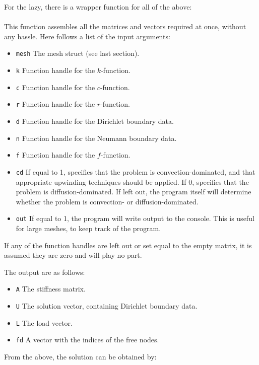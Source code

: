 \documentclass[a4paper,10pt]{article}
\begin{document}
For the lazy, there is a wrapper function for all of the above: \\

 \\

This function assembles all the matrices and vectors required at once, without
any hassle. Here follows a list of the input arguments:

\begin{itemize}
\item {\tt mesh} The mesh struct (see last section).
\item {\tt k} Function handle for the $k$-function.
\item {\tt c} Function handle for the $c$-function.
\item {\tt r} Function handle for the $r$-function.
\item {\tt d} Function handle for the Dirichlet boundary data.
\item {\tt n} Function handle for the Neumann boundary data.
\item {\tt f} Function handle for the $f$-function.
\item {\tt cd} If equal to 1, specifies that the problem is convection-dominated,
and that appropriate upwinding techniques should be applied. If 0, specifies
that the problem is diffusion-dominated. If left out, the program itself will
determine whether the problem is convection- or diffusion-dominated.
\item {\tt out} If equal to 1, the program will write output to the console.
This is useful for large meshes, to keep track of the program.
\end{itemize}

If any of the function handles are left out or set equal to the empty matrix, 
it is assumed they are zero and will play no part.

The output are as follows:

\begin{itemize}
\item {\tt A} The stiffness matrix.
\item {\tt U} The solution vector, containing Dirichlet boundary data.
\item {\tt L} The load vector.
\item {\tt fd} A vector with the indices of the free nodes.
\end{itemize}

From the above, the solution can be obtained by: \\
\end{document}
